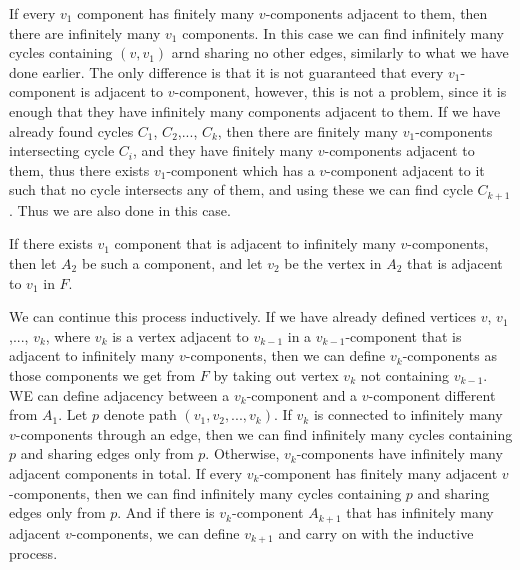 \documentclass{article}
\begin{document}
If every \(\displaystyle v_1\) component has finitely many \(\displaystyle v\)-components adjacent to them, then there are infinitely many \(\displaystyle v_1\) components. In this case we can find infinitely many cycles containing \(\displaystyle (v,v_1)\) arnd sharing no other edges, similarly to what we have done earlier. The only difference is that it is not guaranteed that every \(\displaystyle v_1\)-component is adjacent to \(\displaystyle v\)-component, however, this is not a problem, since it is enough that they have infinitely many components adjacent to them. If we have already found cycles \(\displaystyle C_1\), \(\displaystyle C_2\),..., \(\displaystyle C_k\), then there are finitely many \(\displaystyle v_1\)-components intersecting cycle \(\displaystyle C_i\), and they have finitely many \(\displaystyle v\)-components adjacent to them, thus there exists \(\displaystyle v_1\)-component which has a \(\displaystyle v\)-component adjacent to it such that no cycle intersects any of them, and using these we can find cycle \(\displaystyle C_{k+1}\). Thus we are also done in this case.

If there exists \(\displaystyle v_1\) component that is adjacent to infinitely many \(\displaystyle v\)-components, then let \(\displaystyle A_2\) be such a component, and let \(\displaystyle v_2\) be the vertex in \(\displaystyle A_2\) that is adjacent to \(\displaystyle v_1\) in \(\displaystyle F\).

We can continue this process inductively. If we have already defined vertices \(\displaystyle v\), \(\displaystyle v_1\),..., \(\displaystyle v_k\), where \(\displaystyle v_k\) is a vertex adjacent to \(\displaystyle v_{k-1}\) in a \(\displaystyle v_{k-1}\)-component that is adjacent to infinitely many \(\displaystyle v\)-components, then we can define \(\displaystyle v_k\)-components as those components we get from \(\displaystyle F\) by taking out vertex \(\displaystyle v_k\) not containing \(\displaystyle v_{k-1}\). WE can define adjacency between a \(\displaystyle v_k\)-component and a \(\displaystyle v\)-component different from \(\displaystyle A_1\). Let \(\displaystyle p\) denote path \(\displaystyle (v_1,v_2,...,v_k)\). If \(\displaystyle v_k\) is connected to infinitely many \(\displaystyle v\)-components through an edge, then we can find infinitely many cycles containing \(\displaystyle p\) and sharing edges only from \(\displaystyle p\). Otherwise, \(\displaystyle v_k\)-components have infinitely many adjacent components in total. If every \(\displaystyle v_k\)-component has finitely many adjacent \(\displaystyle v\)-components, then we can find infinitely many cycles containing \(\displaystyle p\) and sharing edges only from \(\displaystyle p\). And if there is \(\displaystyle v_k\)-component \(\displaystyle A_{k+1}\) that has infinitely many adjacent \(\displaystyle v\)-components, we can define \(\displaystyle v_{k+1}\) and carry on with the inductive process.
\end{document}
